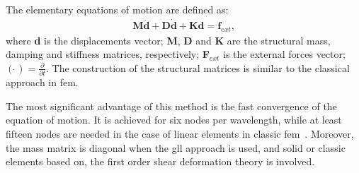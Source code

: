 The elementary equations of motion are defined as:
\begin{eqnarray}
	\label{eq:motion}
	\textbf{M} \ddot{\textbf{d}} + \textbf{D} \dot{\textbf{d}} + \textbf{K} \textbf{d} = \textbf{f}_{ext},
\end{eqnarray}
%
%
%
%
%
where \textbf{d} is the displacements vector; \textbf{M}, \textbf{D} and \textbf{K} are the structural mass, damping and stiffness matrices, respectively; \textbf{F}$_{ext}$ is the external forces vector; \((\dot{\ })=\frac{\partial}{\partial t}\).
The construction of the structural matrices is similar to the classical approach in \ac{fem}.

The most significant advantage of this method is the fast convergence of the equation of motion.
It is achieved for six nodes per wavelength, while at least fifteen nodes are needed in the case of linear elements in classic \ac{fem}~\cite{wee2017simulating}.
Moreover, the mass matrix is diagonal when the \ac{gll} approach is used, and solid or classic elements based on, the first order shear deformation theory is involved.

